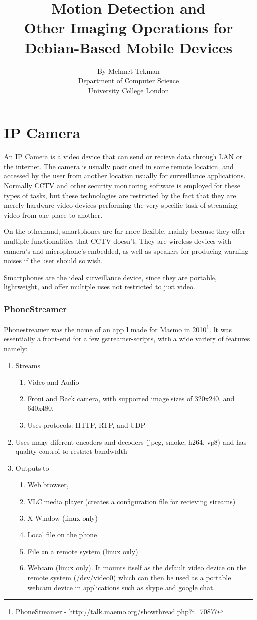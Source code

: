 \documentclass[11pt]{article} %
\title{\Huge Motion Detection and\\Other Imaging Operations for\\Debian-Based Mobile Devices }
\author{\small By Mehmet Tekman\\\small Department of Computer Science\\\small University College London}
\begin{document}
\part{IP Camera}

An IP Camera is a video device that can send or recieve data through LAN or the internet. The camera is usually positioned in some remote location, and accessed by the user from another location usually for surveillance applications.  Normally CCTV and other security monitoring software is employed for these types of tasks, but these technologies are restricted by the fact that they are merely hardware video devices performing the very specific task of streaming video from one place to another.

On the otherhand, smartphones are far more flexible, mainly because they offer multiple functionalities that CCTV doesn't. They are wireless devices with camera's and microphone's embedded, as well as speakers for producing warning noises if the user should so wish.

Smartphones are the ideal surveillance device, since they are portable, lightweight, and offer multiple uses not restricted to just video.

\section{PhoneStreamer}

Phonestreamer was the name of an app I made for Maemo in 2010\footnote{PhoneStreamer - http://talk.maemo.org/showthread.php?t=70877}. It was essentially a front-end for a few gstreamer-scripts, with a wide variety of features namely:
\begin{enumerate}
\item Streams
	\begin{enumerate}
	\item Video and Audio
	\item Front and Back camera, with supported image sizes of 320x240, and 640x480.
	\item Uses protocols: HTTP, RTP, and UDP
	\end{enumerate}
\item Uses many diferent encoders and decoders (jpeg, smoke, h264, vp8)  and has quality control to restrict bandwidth
\item Outputs to
	\begin{enumerate}
	\item Web browser,
	\item VLC media player (creates a configuration file for recieving streams)
	\item X Window (linux only)
	\item Local file on the phone
	\item File on a remote system (linux only)
	\item Webcam (linux only). It mounts itself as the default video device on the remote system (/dev/video0) which can then be used as a portable webcam device in applications such as skype and google chat.
	\end{enumerate}
\end{enumerate}
\end{document}
